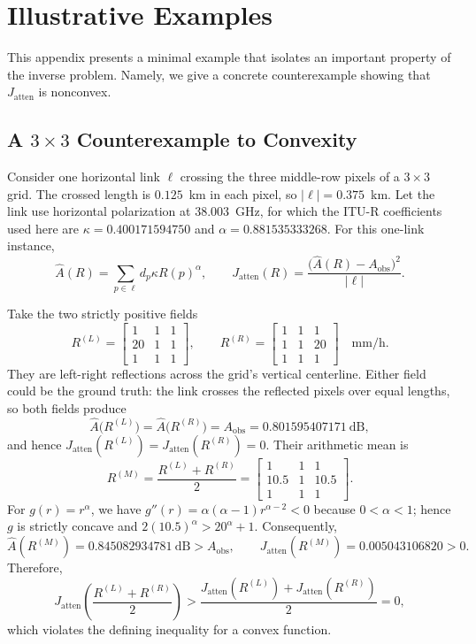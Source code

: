 \documentclass[a4paper,fleqn]{cas-sc}
\begin{document}


\appendix
{}

\section{Illustrative Examples}

This appendix presents a minimal example that isolates an important property of the inverse problem. Namely, we give a concrete counterexample showing that $J_{\text{atten}}$ is nonconvex.

\subsection{A $3\times3$ Counterexample to Convexity}
\label{appendix:nonconvexity-example}
Consider one horizontal link $\ell$ crossing the three middle-row pixels of a
$3\times3$ grid.  The crossed length is $0.125$~km in each pixel, so
$|\ell|=0.375$~km.  Let the link use horizontal polarization at
$38.003$~GHz, for which the ITU-R coefficients used here are
$\kappa=0.400171594750$ and $\alpha=0.881535333268$.  For this one-link
instance,
\[
\widehat A(R)=\sum_{p\in\ell}d_p\kappa R(p)^\alpha,
\qquad
J_{\mathrm{atten}}(R)=
\frac{\bigl(\widehat A(R)-A_{\mathrm{obs}}\bigr)^2}{|\ell|}.
\]

Take the two strictly positive fields
\[
R^{(L)}=\begin{bmatrix}1&1&1\\20&1&1\\1&1&1\end{bmatrix},
\qquad
R^{(R)}=\begin{bmatrix}1&1&1\\1&1&20\\1&1&1\end{bmatrix}
\quad \si{\milli\meter\per\hour}.
\]
They are left-right reflections across the grid's vertical centerline.  Either
field could be the ground truth: the link crosses the reflected pixels over
equal lengths, so both fields produce
\[
\widehat A\bigl(R^{(L)}\bigr)=\widehat A\bigl(R^{(R)}\bigr)
=A_{\mathrm{obs}}=0.801595407171\ \si{\deci\bel},
\]
and hence
$J_{\mathrm{atten}}(R^{(L)})=J_{\mathrm{atten}}(R^{(R)})=0$.
Their arithmetic mean is
\[
R^{(M)}=\frac{R^{(L)}+R^{(R)}}{2}
=\begin{bmatrix}1&1&1\\10.5&1&10.5\\1&1&1\end{bmatrix}.
\]
For $g(r)=r^\alpha$, we have
$g''(r)=\alpha(\alpha-1)r^{\alpha-2}<0$ because $0<\alpha<1$; hence $g$ is
strictly concave and
$2(10.5)^\alpha>20^\alpha+1$.  Consequently,
\[
\widehat A(R^{(M)})=0.845082934781\ \si{\deci\bel}>A_{\mathrm{obs}},
\qquad
J_{\mathrm{atten}}(R^{(M)})=0.005043106820>0.
\]
Therefore,
\[
J_{\mathrm{atten}}\!\left(\frac{R^{(L)}+R^{(R)}}{2}\right)
>
\frac{J_{\mathrm{atten}}(R^{(L)})+J_{\mathrm{atten}}(R^{(R)})}{2}=0,
\]
which violates the defining inequality for a convex function.
\end{document}
